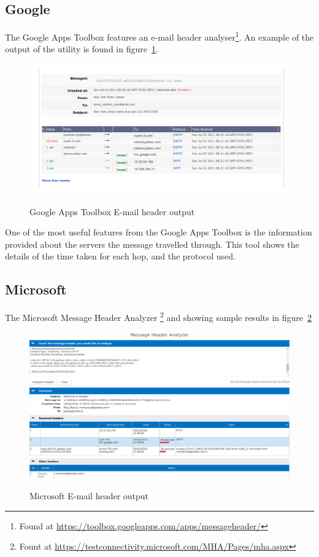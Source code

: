 \subsection{Google}

The Google Apps Toolbox features an e-mail header analyser\footnote{Found at
	\url{https://toolbox.googleapps.com/apps/messageheader/}}. An example
of the output of the utility is found in figure~\ref{fig:goo}.

\begin{figure} \centering 
	\includegraphics[width=0.8\linewidth]{google-header} \label{fig:goo}
	\caption{Google Apps Toolbox E-mail header output} \end{figure}

One of the most useful features from the Google Apps Toolbox is the information
provided about the servers the message travelled through.  This tool shows the
details of the time taken for each hop, and the protocol used.  

\subsection{Microsoft}

The Microsoft Message Header Analyzer \footnote{Fount at
	\url{https://testconnectivity.microsoft.com/MHA/Pages/mha.aspx}} and
showing sample results in figure~\ref{fig:mic}

\begin{figure} \centering
	\includegraphics[width=0.8\linewidth]{microsoft-header} \label{fig:mic}
	\caption{Microsoft E-mail header output} \end{figure}

